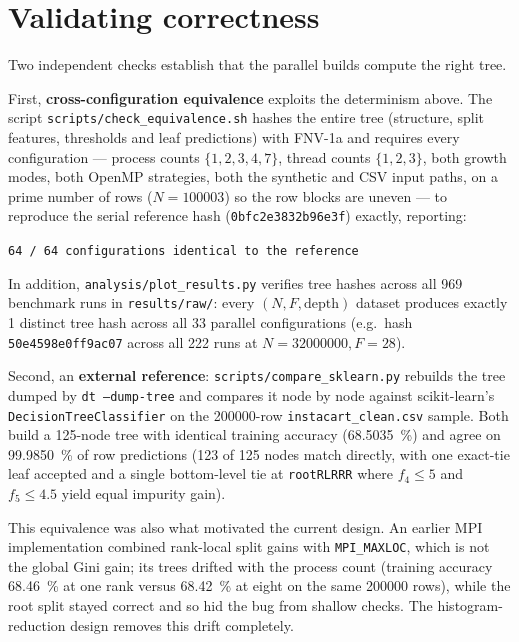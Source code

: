 \documentclass[11pt]{article}
\begin{document}
\section{Validating correctness}\label{sec:valid}

Two independent checks establish that the parallel builds compute the right tree.

First, \textbf{cross-configuration equivalence} exploits the determinism above. The script \texttt{scripts/check\_equivalence.sh} hashes the entire tree (structure, split features, thresholds and leaf predictions) with FNV-1a and requires every configuration --- process counts $\{1,2,3,4,7\}$, thread counts $\{1,2,3\}$, both growth modes, both OpenMP strategies, both the synthetic and CSV input paths, on a prime number of rows ($N=\num{100003}$) so the row blocks are uneven --- to reproduce the serial reference hash (\texttt{0bfc2e3832b96e3f}) exactly, reporting:
\begin{center}
\texttt{64 / 64 configurations identical to the reference}
\end{center}
In addition, \texttt{analysis/plot\_results.py} verifies tree hashes across all \num{969} benchmark runs in \texttt{results/raw/}: every $(N,F,\text{depth})$ dataset produces exactly \num{1} distinct tree hash across all \num{33} parallel configurations (e.g.\ hash \texttt{50e4598e0ff9ac07} across all \num{222} runs at $N=\num{32000000}, F=\num{28}$).

Second, an \textbf{external reference}: \texttt{scripts/compare\_sklearn.py} rebuilds the tree dumped by \texttt{dt --dump-tree} and compares it node by node against scikit-learn's \texttt{DecisionTreeClassifier} on the \num{200000}-row \texttt{instacart\_clean.csv} sample. Both build a \num{125}-node tree with identical training accuracy (\SI{68.5035}{\percent}) and agree on \SI{99.9850}{\percent} of row predictions (\num{123} of \num{125} nodes match directly, with one exact-tie leaf accepted and a single bottom-level tie at \texttt{rootRLRRR} where $f_4 \le 5$ and $f_5 \le 4.5$ yield equal impurity gain).

This equivalence was also what motivated the current design. An earlier MPI implementation combined rank-local split gains with \texttt{MPI\_MAXLOC}, which is not the global Gini gain; its trees drifted with the process count (training accuracy \SI{68.46}{\percent} at one rank versus \SI{68.42}{\percent} at eight on the same \num{200000} rows), while the root split stayed correct and so hid the bug from shallow checks. The histogram-reduction design removes this drift completely.
\end{document}
